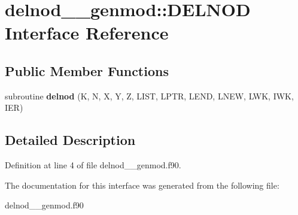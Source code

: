 \hypertarget{interfacedelnod____genmod_1_1_d_e_l_n_o_d}{\section{delnod\+\_\+\+\_\+genmod\+:\+:D\+E\+L\+N\+O\+D Interface Reference}
\label{interfacedelnod____genmod_1_1_d_e_l_n_o_d}
}
\subsection*{Public Member Functions}
\begin{DoxyCompactItemize}
\item 
\hypertarget{interfacedelnod____genmod_1_1_d_e_l_n_o_d_a5c912c2f1f5c1c776679f6dd9b189422}{subroutine {\bfseries delnod} (K, N, X, Y, Z, L\+I\+S\+T, L\+P\+T\+R, L\+E\+N\+D, L\+N\+E\+W, L\+W\+K, I\+W\+K, I\+E\+R)}\label{interfacedelnod____genmod_1_1_d_e_l_n_o_d_a5c912c2f1f5c1c776679f6dd9b189422}

\end{DoxyCompactItemize}


\subsection{Detailed Description}


Definition at line 4 of file delnod\+\_\+\+\_\+genmod.\+f90.



The documentation for this interface was generated from the following file\+:\begin{DoxyCompactItemize}
\item 
delnod\+\_\+\+\_\+genmod.\+f90\end{DoxyCompactItemize}
